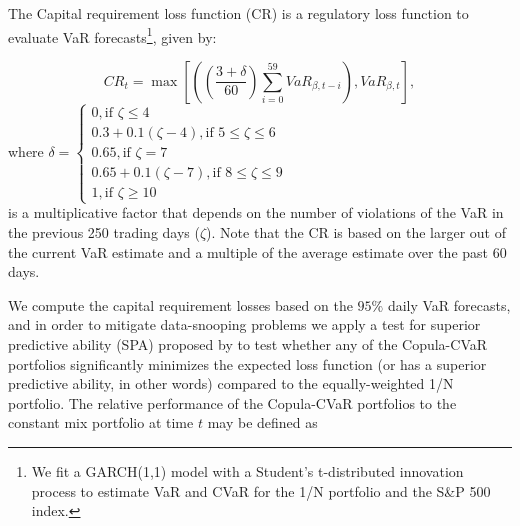 \documentclass[a4paper,10pt]{article}
\begin{document}
\vspace{0.3cm}

The Capital requirement loss function (CR) is a regulatory loss function to evaluate VaR forecasts\footnote{We fit a GARCH(1,1) model with a Student’s t-distributed innovation process to estimate VaR and CVaR for the 1/N portfolio and the S\&P 500 index.}, given by:


\begin{equation}CR_{t} =\max \left [\left (\genfrac{(}{)}{}{}{3 +\delta }{60}\sum _{i =0}^{59}VaR_{\beta  ,t -i}\right ) ,VaR_{\beta  ,t}\right ] ,
\end{equation}where $\delta =\left\{ 
\begin{array}{lr}
0,\text{if }\zeta \leq 4 \\ 
0.3+0.1\left( \zeta -4\right) ,\text{if }5\leq \zeta \leq 6 \\ 
0.65,\text{if }\zeta =7 \\ 
0.65+0.1\left( \zeta -7\right) ,\text{if }8\leq \zeta \leq 9 \\ 
1,\text{if }\zeta \geq 10%
\end{array}%
\right. $\\ 

\vspace{0.3cm} \noindent is a multiplicative factor that depends on the number of violations of the VaR in the previous 250 trading days ($\zeta$). Note that the CR is based on the larger out of the
current VaR estimate and a multiple of the average estimate over the past 60
days.


\vspace{0.3cm}

We compute the capital requirement losses based on the $95\%$ daily VaR
forecasts, and in order to mitigate data-snooping problems we apply a test for superior predictive ability (SPA) proposed by \citet*{hansen2005test} to test whether any of the Copula-CVaR portfolios significantly minimizes the expected loss function (or has a superior predictive ability, in other words) compared to the equally-weighted 1/N portfolio. The relative performance of the Copula-CVaR portfolios to the constant mix portfolio at time $t$ may be defined as 
\end{document}
